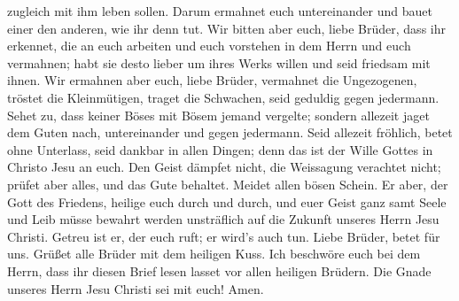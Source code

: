 zugleich mit ihm leben sollen.  Darum ermahnet euch
untereinander und bauet einer den anderen, wie ihr denn tut.
 Wir bitten aber euch, liebe Brüder, dass ihr erkennet, die
an euch arbeiten und euch vorstehen in dem Herrn und euch vermahnen;
 habt sie desto lieber um ihres Werks willen und seid
friedsam mit ihnen.  Wir ermahnen aber euch, liebe Brüder,
vermahnet die Ungezogenen, tröstet die Kleinmütigen, traget die
Schwachen, seid geduldig gegen jedermann.  Sehet zu, dass
keiner Böses mit Bösem jemand vergelte; sondern allezeit jaget dem Guten
nach, untereinander und gegen jedermann.  Seid allezeit
fröhlich,  betet ohne Unterlass,  seid dankbar
in allen Dingen; denn das ist der Wille Gottes in Christo Jesu an euch.
 Den Geist dämpfet nicht,  die Weissagung
verachtet nicht;  prüfet aber alles, und das Gute behaltet.
 Meidet allen bösen Schein.  Er aber, der Gott
des Friedens, heilige euch durch und durch, und euer Geist ganz samt
Seele und Leib müsse bewahrt werden unsträflich auf die Zukunft unseres
Herrn Jesu Christi.  Getreu ist er, der euch ruft; er
wird's auch tun.  Liebe Brüder, betet für uns.
 Grüßet alle Brüder mit dem heiligen Kuss. 
Ich beschwöre euch bei dem Herrn, dass ihr diesen Brief lesen lasset vor
allen heiligen Brüdern.  Die Gnade unseres Herrn Jesu
Christi sei mit euch! Amen.
